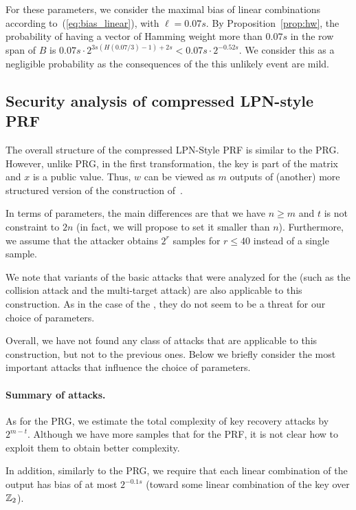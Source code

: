 For these parameters, we consider the maximal bias of linear combinations according to~(\ref{eq:bias_linear}),
with $\ell = 0.07 s$.
By Proposition~\ref{prop:hw},
the probability of having a vector of Hamming weight more than $0.07 s$
in the row span of $B$ is
$0.07 s \cdot 2^{3s (H(0.07/3) - 1) + 2s} < 0.07 s \cdot 2^{-0.52 s}$.
We consider this as a negligible probability
as the consequences of the this unlikely event are mild.


\subsection{Security analysis of compressed LPN-style PRF}

The overall structure of the compressed LPN-Style PRF is similar to the PRG.
However, unlike PRG, in the first transformation, the key is part of the matrix and
$x$ is a public value.
Thus, $w$ can be viewed as $m$ outputs of (another) more
structured version of the construction of~\cite{boneh2018-darkmatter}.

In terms of parameters, the main differences are that we have $n \geq m$
and $t$ is not constraint to $2n$ (in fact, we will propose to set it smaller than $n$).
Furthermore, we assume that the attacker obtains $2^r$ samples for $r \leq 40$ instead of a single sample.

We note that variants of the basic attacks that were analyzed for the \ttwPRF (such as the collision attack
and the multi-target attack) are also applicable to this construction.
As in the case of the \ttwPRF,
they do not seem to be a threat for our choice of parameters.

Overall, we have not found any class of attacks that are
applicable to this construction, but not to the previous ones.
Below we briefly consider the most important attacks that influence the
choice of parameters.

\paragraph{Summary of attacks.}
As for the PRG, we estimate the total complexity of key recovery attacks by $2^{m - t}$.
Although we have more samples that for the PRF,
it is not clear how to exploit them to obtain better complexity.

In addition, similarly to the PRG,
we require that each linear combination of the output
has bias of at most $2^{-0.1 s}$
(toward some linear combination of the key over $\mathbb{Z}_2$).


